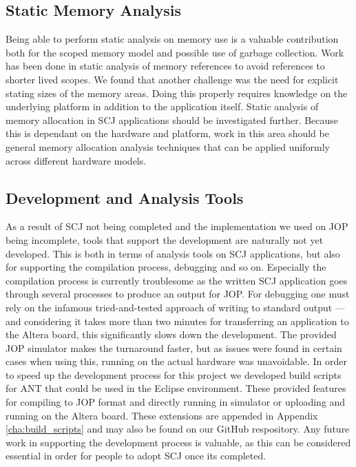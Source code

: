 \subsection{Static Memory Analysis} %
\label{sub:memoryanalysis}
Being able to perform static analysis on memory use is a valuable contribution both for the scoped memory model and possible use of garbage collection. Work has been done in static analysis of memory references to avoid references to shorter lived scopes\cite{Dalsgaard:2012:PMA:2388936.2388939}. We found that another challenge was the need for explicit stating sizes of the memory areas. Doing this properly requires knowledge on the underlying platform in addition to the application itself. Static analysis of memory allocation in SCJ applications should be investigated further. Because this is dependant on the hardware and platform, work in this area should be general memory allocation analysis techniques that can be applied uniformly across different hardware models.


\subsection{Development and Analysis Tools} %
\label{sub:development_and_analysis_tools}
As a result of SCJ not being completed and the implementation we used on JOP being incomplete, tools that support the development are naturally not yet developed. This is both in terms of analysis tools on SCJ applications, but also for supporting the compilation process, debugging and so on. Especially the compilation process is currently troublesome as the written SCJ application goes through several processes to produce an output for JOP. For debugging one must rely on the infamous tried-and-tested approach of writing to standard output --- and considering it takes more than two minutes for transferring an application to the Altera board, this significantly slows down the development. The provided JOP simulator makes the turnaround faster, but as issues were found in certain cases when using this, running on the actual hardware was unavoidable. In order to speed up the development process for this project we developed build scripts for ANT that could be used in the Eclipse environment. These provided features for compiling to JOP format and directly running in simulator or uploading and running on the Altera board. These extensions are appended in Appendix \ref{cha:build_scripts} and may also be found on our GitHub respository\cite{SW902e12:CSPinSCJ}. Any future work in supporting the development process is valuable, as this can be considered essential in order for people to adopt SCJ once its completed.


